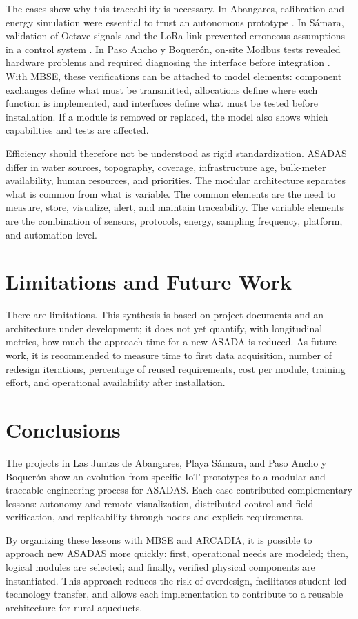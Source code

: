 \documentclass[conference]{IEEEtran}
\begin{document}
The cases show why this traceability is necessary. In Abangares, calibration and energy simulation were essential to trust an autonomous prototype \cite{Chavarria2021}. In Sámara, validation of Octave signals and the LoRa link prevented erroneous assumptions in a control system \cite{Solorzano2021}. In Paso Ancho y Boquerón, on-site Modbus tests revealed hardware problems and required diagnosing the interface before integration \cite{Oviedo2024}. With MBSE, these verifications can be attached to model elements: component exchanges define what must be transmitted, allocations define where each function is implemented, and interfaces define what must be tested before installation. If a module is removed or replaced, the model also shows which capabilities and tests are affected.

Efficiency should therefore not be understood as rigid standardization. ASADAS differ in water sources, topography, coverage, infrastructure age, bulk-meter availability, human resources, and priorities. The modular architecture separates what is common from what is variable. The common elements are the need to measure, store, visualize, alert, and maintain traceability. The variable elements are the combination of sensors, protocols, energy, sampling frequency, platform, and automation level.

\section{Limitations and Future Work}
There are limitations. This synthesis is based on project documents and an architecture under development; it does not yet quantify, with longitudinal metrics, how much the approach time for a new ASADA is reduced. As future work, it is recommended to measure time to first data acquisition, number of redesign iterations, percentage of reused requirements, cost per module, training effort, and operational availability after installation.

\section{Conclusions}
The projects in Las Juntas de Abangares, Playa Sámara, and Paso Ancho y Boquerón show an evolution from specific IoT prototypes to a modular and traceable engineering process for ASADAS. Each case contributed complementary lessons: autonomy and remote visualization, distributed control and field verification, and replicability through nodes and explicit requirements.

By organizing these lessons with MBSE and ARCADIA, it is possible to approach new ASADAS more quickly: first, operational needs are modeled; then, logical modules are selected; and finally, verified physical components are instantiated. This approach reduces the risk of overdesign, facilitates student-led technology transfer, and allows each implementation to contribute to a reusable architecture for rural aqueducts.



\end{document}
